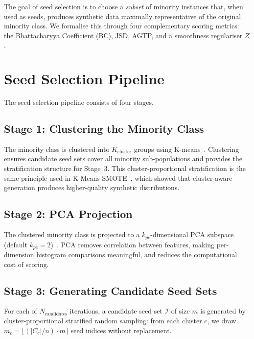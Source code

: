 The goal of seed selection is to choose a \emph{subset} of minority instances that, when used as seeds, produces synthetic data maximally representative of the original minority class.
We formalise this through four complementary scoring metrics: the Bhattacharyya Coefficient (BC), JSD, AGTP, and a smoothness regulariser $Z$.

\section{Seed Selection Pipeline}
\label{sec:seed:pipeline}

The seed selection pipeline consists of four stages.

\subsection{Stage 1: Clustering the Minority Class}

The minority class is clustered into $K_{\mathrm{cluster}}$ groups using K-means~\cite{macqueen1967some, arthur2007kmeans}.
Clustering ensures candidate seed sets cover all minority sub-populations and provides the stratification structure for Stage~3.
This cluster-proportional stratification is the same principle used in K-Means SMOTE~\cite{douzas2018improving}, which showed that cluster-aware generation produces higher-quality synthetic distributions.

\subsection{Stage 2: PCA Projection}

The clustered minority class is projected to a $k_{pc}$-dimensional PCA subspace (default $k_{pc} = 2$)~\cite{jolliffe2002principal, bishop2006pattern}.
PCA removes correlation between features, making per-dimension histogram comparisons meaningful, and reduces the computational cost of scoring.

\subsection{Stage 3: Generating Candidate Seed Sets}

For each of $N_{\mathrm{candidates}}$ iterations, a candidate seed set $\mathcal{I}$ of size $m$ is generated by cluster-proportional stratified random sampling: from each cluster $c$, we draw $m_c = \lfloor (|C_c|/n) \cdot m \rceil$ seed indices without replacement.


